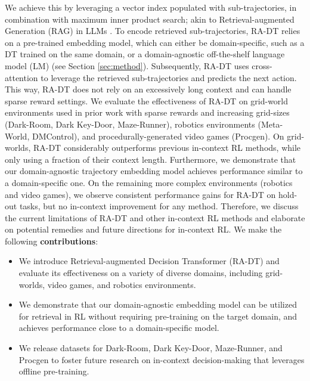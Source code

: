 \documentclass{article}
\begin{document}
We achieve this by leveraging a vector index populated with sub-trajectories, in combination with maximum inner product search; akin to Retrieval-augmented Generation (RAG) in LLMs \citep{Khandelwal:19, Lewis:20, Borgeaud:22}.
To encode retrieved sub-trajectories, RA-DT relies on a pre-trained embedding model, which can either be domain-specific, such as a DT trained on the same domain, or a domain-agnostic off-the-shelf language model (LM) (see Section \ref{sec:method}).
Subsequently, RA-DT uses cross-attention to leverage the retrieved sub-trajectories and predicts the next action.
This way, RA-DT does not rely on an excessively long context and can handle sparse reward settings.
We evaluate the effectiveness of RA-DT on grid-world environments used in prior work with sparse rewards and increasing grid-sizes (Dark-Room, Dark Key-Door, Maze-Runner),  robotics environments (Meta-World, DMControl), and procedurally-generated video games (Procgen).
On grid-worlds, RA-DT considerably outperforms previous in-context RL methods, while only using a fraction of their context length.
Furthermore, we demonstrate that our domain-agnostic trajectory embedding model achieves performance similar to a domain-specific one.
On the remaining more complex environments (robotics and video games), we observe consistent performance gains for RA-DT on hold-out tasks, but no in-context improvement for any method.
Therefore, we discuss the current limitations of RA-DT and other in-context RL methods and elaborate on potential remedies and future directions for in-context RL.
We make the following \textbf{contributions}:
\begin{itemize}
    \item We introduce Retrieval-augmented Decision Transformer (RA-DT) and evaluate its effectiveness on a variety of diverse domains, including grid-worlds, video games, and robotics environments.
    \item We demonstrate that our domain-agnostic embedding model can be utilized for retrieval in RL without requiring pre-training on the target domain, and achieves performance close to a domain-specific model.
    \item We release datasets for Dark-Room, Dark Key-Door, Maze-Runner, and Procgen to foster future research on in-context decision-making that leverages offline pre-training.
\end{itemize}
\end{document}

